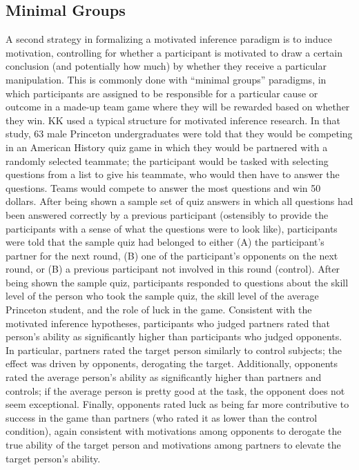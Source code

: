 \documentclass{article}
\begin{document}
\subsection{Minimal Groups}
A second strategy in formalizing a motivated inference paradigm is to induce motivation, controlling for whether a participant is motivated to draw a certain conclusion (and potentially how much) by whether they receive a particular manipulation. This is commonly done with ``minimal groups'' paradigms, in which participants are assigned to be responsible for a particular cause or outcome in a made-up team game where they will be rewarded based on whether they win. KK used a typical structure for motivated inference research. In that study, 63 male Princeton undergraduates were told that they would be competing in an American History quiz game in which they would be partnered with a randomly selected teammate; the participant would be tasked with selecting questions from a list to give his teammate, who would then have to answer the questions. Teams would compete to answer the most questions and win 50 dollars. After being shown a sample set of quiz answers in which all questions had been answered correctly by a previous participant (ostensibly to provide the participants with a sense of what the questions were to look like), participants were told that the sample quiz had belonged to either (A) the participant's partner for the next round, (B) one of the participant's opponents on the next round, or (B) a previous participant not involved in this round (control). After being shown the sample quiz, participants responded to questions about the skill level of the person who took the sample quiz, the skill level of the average Princeton student, and the role of luck in the game. 
Consistent with the motivated inference hypotheses, participants who judged partners rated that person's ability as significantly higher than participants who judged opponents. In particular, partners rated the target person similarly to control subjects; the effect was driven by opponents, derogating the target. Additionally, opponents rated the average person's ability as significantly higher than partners and controls; if the average person is pretty good at the task, the opponent does not seem exceptional. Finally, opponents rated luck as being far more contributive to success in the game than partners (who rated it as lower than the control condition), again consistent with motivations among opponents to derogate the true ability of the target person and motivations among partners to elevate the target person's ability.  
\end{document}
